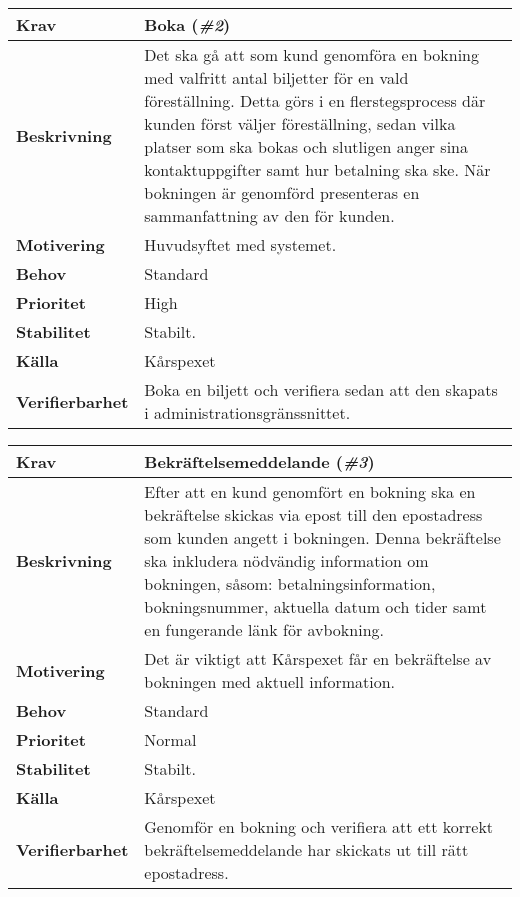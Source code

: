 \documentclass[a4paper, twoside, 11pt, titlepage]{article}
\begin{document}
	\begin{tabular} { p{2.6cm} p{12.5cm} }
		\hline
		\sffamily\textbf{Krav} & Boka (\emph{\#2})  \\
		\hline
		\sffamily\textbf{Beskrivning} & Det ska gå att som kund genomföra en bokning med valfritt antal biljetter för en vald föreställning. Detta görs i en flerstegsprocess där kunden först väljer föreställning, sedan vilka platser som ska bokas och slutligen anger sina kontaktuppgifter samt hur betalning ska ske. När bokningen är genomförd presenteras en sammanfattning av den för kunden.  \\
		\hline
		\sffamily\textbf{Motivering} & Huvudsyftet med systemet.  \\
		\hline
		\sffamily\textbf{Behov} & Standard  \\
		\hline
		\sffamily\textbf{Prioritet} & High  \\
		\hline
		\sffamily\textbf{Stabilitet} & Stabilt.  \\
		\hline
		\sffamily\textbf{Källa} & Kårspexet  \\
		\hline
		\sffamily\textbf{Verifierbarhet} & Boka en biljett och verifiera sedan att den skapats i administrationsgränssnittet.  \\
		\hline
	\end{tabular}
	\vspace{6mm}

	\begin{tabular} { p{2.6cm} p{12.5cm} }
		\hline
		\sffamily\textbf{Krav} & Bekräftelsemeddelande (\emph{\#3})  \\
		\hline
		\sffamily\textbf{Beskrivning} & Efter att en kund genomfört en bokning ska en bekräftelse skickas via epost till den epostadress som kunden angett i bokningen. Denna bekräftelse ska inkludera nödvändig information om bokningen, såsom: betalningsinformation, bokningsnummer, aktuella datum och tider samt en fungerande länk för avbokning.  \\
		\hline
		\sffamily\textbf{Motivering} & Det är viktigt att Kårspexet får en bekräftelse av bokningen med aktuell information.  \\
		\hline
		\sffamily\textbf{Behov} & Standard  \\
		\hline
		\sffamily\textbf{Prioritet} & Normal  \\
		\hline
		\sffamily\textbf{Stabilitet} & Stabilt.  \\
		\hline
		\sffamily\textbf{Källa} & Kårspexet  \\
		\hline
		\sffamily\textbf{Verifierbarhet} & Genomför en bokning och verifiera att ett korrekt bekräftelsemeddelande har skickats ut till rätt epostadress.  \\
		\hline
	\end{tabular}
	\vspace{6mm}
\end{document}
